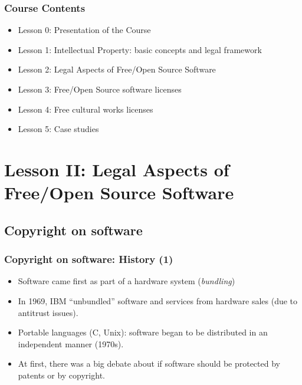 
\begin{frame}
  \frametitle{Course Contents}

  \begin{itemize}
    \item Lesson 0: Presentation of the Course
    \item Lesson 1: Intellectual Property: basic concepts and legal framework
    \item \alert{Lesson 2: Legal Aspects of Free/Open Source Software}
    \item Lesson 3: Free/Open Source software licenses
    \item Lesson 4: Free cultural works licenses
    \item Lesson 5: Case studies
  \end{itemize}

\end{frame}



\section{Lesson II: Legal Aspects of Free/Open Source Software}

\subsection{Copyright on software}

\begin{frame}
\frametitle{Copyright on software: History (1)}

\begin{itemize}
\item Software came first as part of a hardware system (\emph{bundling})
\item In 1969, IBM ``unbundled'' software and services from hardware sales (due to antitrust issues).
\item Portable languages (C, Unix): software began to be distributed in an independent manner (1970s).
\item At first, there was a big debate about if software should be protected
by patents or by copyright.
\end{itemize}

\end{frame}


